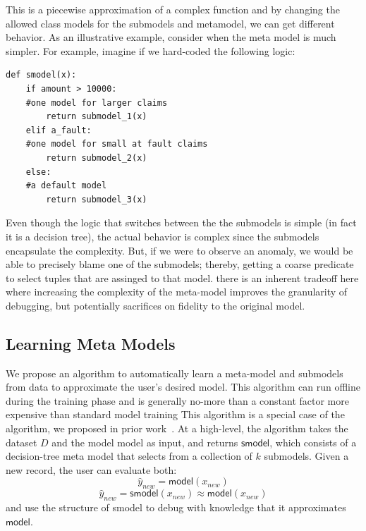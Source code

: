 This is a piecewise approximation of a complex function and by changing the allowed class models for the submodels and metamodel, we can get different behavior. 
As an illustrative example, consider when the meta model is much simpler.
For example, imagine if we hard-coded the following logic:
\begin{lstlisting}
def smodel(x):
    if amount > 10000:
    #one model for larger claims
        return submodel_1(x)
    elif a_fault:
    #one model for small at fault claims
        return submodel_2(x)
    else:
    #a default model
        return submodel_3(x)
\end{lstlisting}
Even though the logic that switches between the the submodels is simple (in fact it is a decision tree), the actual behavior is complex since the submodels encapsulate the complexity.
But, if we were to observe an anomaly, we would be able to precisely blame one of the submodels; thereby, getting a coarse predicate to select tuples that are assinged to that model.
there is an inherent tradeoff here where increasing the complexity of the meta-model improves the granularity of debugging, but potentially sacrifices on fidelity to the original model.

\subsection{Learning Meta Models} 
We propose an algorithm to automatically learn a meta-model and submodels from data to approximate the user's desired model.
This algorithm can run offline during the training phase and is generally no-more than a constant factor more expensive than standard model training
This algorithm is a special case of the algorithm, we proposed in prior work~\cite{DBLP:journals/corr/KrishnanGLMPG16, krishnan17}. At a high-level, the algorithm takes the dataset $D$ and the model \textsf{model} as input, and returns $\textsf{smodel}$, which consists of a decision-tree meta model that selects from a collection of $k$ submodels. Given a new record, the user can evaluate both:
\[
\hat{y}_{new} = \textsf{model}(x_{new})
\]
\[
\hat{y}_{new} = \textsf{smodel}(x_{new}) \approx \textsf{model}(x_{new})
\]
and use the structure of \textsf{smodel} to debug with knowledge that it approximates $\textsf{model}$.

